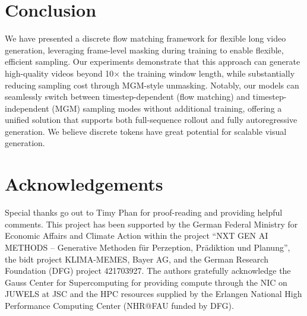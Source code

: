 \section{Conclusion}


We have presented a discrete flow matching framework for flexible long video generation, leveraging frame-level masking during training to enable flexible, efficient sampling. Our experiments demonstrate that this approach can generate high-quality videos beyond 10$\times$ the training window length, while substantially reducing sampling cost through MGM-style unmasking. Notably, our models can seamlessly switch between timestep-dependent (flow matching) and timestep-independent (MGM) sampling modes without additional training, offering a unified solution that supports both full-sequence rollout and fully autoregressive generation. We believe discrete tokens have great potential for scalable visual generation. 

\section{Acknowledgements}

Special thanks go out to Timy Phan for proof-reading and
providing helpful comments.
%
This project has been supported by the German Federal Ministry for Economic Affairs and Climate Action within the project “NXT GEN AI METHODS – Generative Methoden für Perzeption, Prädiktion und Planung”, the bidt project KLIMA-MEMES, Bayer AG, and the German Research Foundation (DFG) project 421703927. The authors gratefully acknowledge the Gauss Center for Supercomputing for providing compute through the NIC on JUWELS at JSC and the HPC resources supplied by the Erlangen National High Performance Computing Center (NHR@FAU funded by DFG).

\newpage